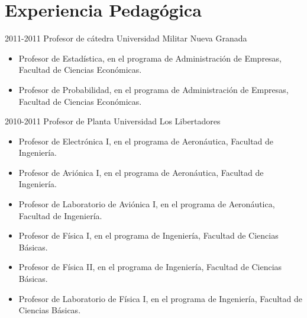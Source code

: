 \section{Experiencia Pedagógica}
\begin{entrylist}
  \entry
    {2011-2011}
    {Profesor de cátedra}
    {Universidad Militar Nueva Granada}
    {\begin{itemize}
        \item{Profesor de Estadística, en el programa de Administración de Empresas, Facultad de Ciencias Económicas.}
        \item{Profesor de Probabilidad, en el programa de Administración de Empresas, Facultad de Ciencias Económicas.}
     \end{itemize}}
  \entry
    {2010-2011}
    {Profesor de Planta}
    {Universidad Los Libertadores}
    {\begin{itemize}
       \item{Profesor de Electrónica I, en el programa de Aeronáutica, Facultad de Ingeniería.}
       \item{Profesor de Aviónica I, en el programa de Aeronáutica, Facultad de Ingeniería.}
       \item{Profesor de Laboratorio de Aviónica I, en el programa de Aeronáutica, Facultad de Ingeniería.}
       \item{Profesor de Física I, en el programa de Ingeniería, Facultad de Ciencias Básicas.}
       \item{Profesor de Física II, en el programa de Ingeniería, Facultad de Ciencias Básicas.}
       \item{Profesor de Laboratorio de Física I, en el programa de Ingeniería, Facultad de Ciencias Básicas.}
     \end{itemize}}
\end{entrylist}
